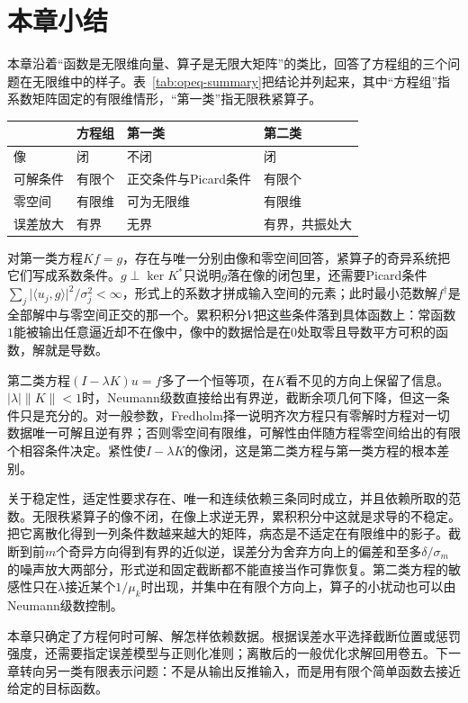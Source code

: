 \section{本章小结}
\label{sec:opeq-summary}

本章沿着“函数是无限维向量、算子是无限大矩阵”的类比，回答了方程组的三个问题在无限维中的样子。表~\ref{tab:opeq-summary}把结论并列起来，其中“方程组”指系数矩阵固定的有限维情形，“第一类”指无限秩紧算子。

\begin{BookInlineTable}
  \centering
  \caption{方程组与两类算子方程的比较。}
  \label{tab:opeq-summary}
  \begin{tabular}{llll}
    \toprule
    & 方程组 & 第一类 & 第二类 \\
    \midrule
    像 & 闭 & 不闭 & 闭 \\
    可解条件 & 有限个 & 正交条件与Picard条件 & 有限个 \\
    零空间 & 有限维 & 可为无限维 & 有限维 \\
    误差放大 & 有界 & 无界 & 有界，共振处大 \\
    \bottomrule
  \end{tabular}
\end{BookInlineTable}

对第一类方程$Kf=g$，存在与唯一分别由像和零空间回答，紧算子的奇异系统把它们写成系数条件。$g\perp\ker K^*$只说明$g$落在像的闭包里，还需要Picard条件$\sum_j\lvert\langle u_j,g\rangle\rvert^2/\sigma_j^2<\infty$，形式上的系数才拼成输入空间的元素；此时最小范数解$f^\dagger$是全部解中与零空间正交的那一个。累积积分$V$把这些条件落到具体函数上：常函数$1$能被输出任意逼近却不在像中，像中的数据恰是在$0$处取零且导数平方可积的函数，解就是导数。

第二类方程$(I-\lambda K)u=f$多了一个恒等项，在$K$看不见的方向上保留了信息。$\lvert\lambda\rvert\lVert K\rVert<1$时，Neumann级数直接给出有界逆，截断余项几何下降，但这一条件只是充分的。对一般参数，Fredholm择一说明齐次方程只有零解时方程对一切数据唯一可解且逆有界；否则零空间有限维，可解性由伴随方程零空间给出的有限个相容条件决定。紧性使$I-\lambda K$的像闭，这是第二类方程与第一类方程的根本差别。

关于稳定性，适定性要求存在、唯一和连续依赖三条同时成立，并且依赖所取的范数。无限秩紧算子的像不闭，在像上求逆无界，累积积分中这就是求导的不稳定。把它离散化得到一列条件数越来越大的矩阵，病态是不适定在有限维中的影子。截断到前$m$个奇异方向得到有界的近似逆，误差分为舍弃方向上的偏差和至多$\delta/\sigma_m$的噪声放大两部分，形式逆和固定截断都不能直接当作可靠恢复。第二类方程的敏感性只在$\lambda$接近某个$1/\mu_k$时出现，并集中在有限个方向上，算子的小扰动也可以由Neumann级数控制。

本章只确定了方程何时可解、解怎样依赖数据。根据误差水平选择截断位置或惩罚强度，还需要指定误差模型与正则化准则；离散后的一般优化求解回用卷五。下一章转向另一类有限表示问题：不是从输出反推输入，而是用有限个简单函数去接近给定的目标函数。
